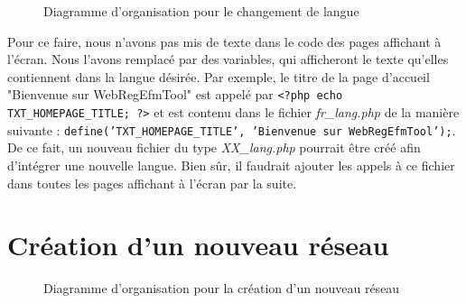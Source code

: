 \begin{figure}[!ht]
	\begin{center}
		\caption{Diagramme d'organisation pour le changement de langue}
  		\label{DiagLangues}
  	\end{center}	
\end{figure}

Pour ce faire, nous n'avons pas mis de texte dans le code des pages affichant à l'écran. Nous l'avons remplacé par des variables, qui afficheront le texte qu'elles contiennent dans la langue désirée. Par exemple, le titre de la page d'accueil "Bienvenue sur WebRegEfmTool" est appelé par \texttt{<?php echo TXT\_HOMEPAGE\_TITLE; ?>} et est contenu dans le fichier \emph{fr\_lang.php} de la manière suivante :
\texttt{define('TXT\_HOMEPAGE\_TITLE', 'Bienvenue sur WebRegEfmTool');}. De ce fait, un nouveau fichier du type \emph{XX\_lang.php} pourrait être créé afin d'intégrer une nouvelle langue. Bien sûr, il faudrait ajouter les appels à ce fichier dans toutes les pages affichant à l'écran par la suite. 

\section{Création d'un nouveau réseau}

\begin{figure}[!ht]
    \begin{center}
        \caption{Diagramme d'organisation pour la création d'un nouveau réseau}
          \label{boutonInit}
      \end{center}   
\end{figure}

